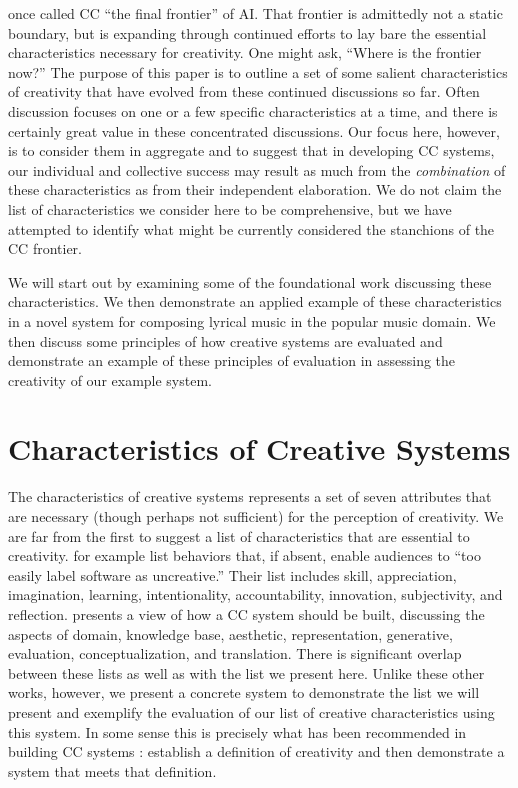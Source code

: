 \documentclass[phd,electronic,oneside,twosidetoc,letterpaper,chaptercenter,parttop,lol,lof,lot]{byumsphd}
\begin{document}
\cite{colton2012computational} once called CC ``the final frontier'' of AI. That frontier is admittedly not a static boundary, but is expanding through continued efforts to lay bare the essential characteristics necessary for creativity. One might ask, ``Where is the frontier now?'' The purpose of this paper is to outline a set of some salient characteristics of creativity that have evolved from these continued discussions so far. Often discussion focuses on one or a few specific characteristics at a time, and there is certainly great value in these concentrated discussions. Our focus here, however, is to consider them in aggregate and to suggest that in developing CC systems, our individual and collective success may result as much from the \textit{combination} of these characteristics as from their independent elaboration. We do not claim the list of characteristics we consider here to be comprehensive, but we have attempted to identify what might be currently considered the stanchions of the CC frontier.

We will start out by examining some of the foundational work discussing these characteristics. We then demonstrate an applied example of these characteristics in a novel system for composing lyrical music in the popular music domain. We then discuss some principles of how creative systems are evaluated and demonstrate an example of these principles of evaluation in assessing the creativity of our example system.

\section{Characteristics of Creative Systems}

The characteristics of creative systems represents a set of seven attributes that are necessary (though perhaps not sufficient) for the perception of creativity. We are far from the first to suggest a list of characteristics that are essential to creativity. \cite{colton2015stakeholder} for example list behaviors that, if absent, enable audiences to ``too easily label software as uncreative.'' Their list includes skill, appreciation, imagination, learning, intentionality, accountability, innovation, subjectivity, and reflection. \cite{Ventura2017HowSystem} presents a view of how a CC system should be built, discussing the aspects of domain, knowledge base, aesthetic, representation, generative, evaluation, conceptualization, and translation. There is significant overlap between these lists as well as with the list we present here. Unlike these other works, however, we present a concrete system to demonstrate the list we will present and exemplify the evaluation of our list of creative characteristics using this system. In some sense this is precisely what has been recommended in building CC systems \citep{Jordanous2014}: establish a definition of creativity and then demonstrate a system that meets that definition.
\end{document}
